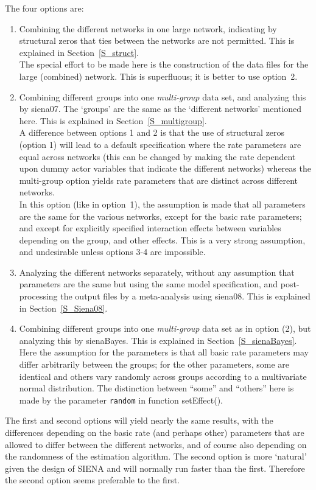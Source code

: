 \documentclass[a4paper,fleqn,11pt]{article}
\newcommand{\+}{\, + \,}
\newcommand{\sfn}[1]{\textsf{#1}}
\newcommand{\SI}{{\sf SIENA }}
\begin{document}
\noindent
The four options are:
\begin{enumerate}
\item Combining the different networks in one large network,
      indicating by structural zeros that ties between the
      networks are not permitted.
      This is explained in Section~\ref{S_struct}.\\
      The special effort to be made here is the construction
      of the data files for the large (combined) network.
      This is superfluous; it is better to use option~2.
\item Combining different groups
      into one \emph{multi-group} data set,
      and analyzing this by \sfn{siena07}.
      The `groups' are the same as the `different networks'
      mentioned here.
      This is explained in Section~\ref{S_multigroup}.\\
      A difference between options 1 and 2 is that the use
      of structural zeros (option 1) will lead to a default specification
      where the rate parameters are equal across networks
      (this can be changed by making the rate dependent upon dummy actor
      variables that indicate the different networks)
      whereas the multi-group option yields rate parameters
      that are distinct across different networks.\\
      In this option (like in option~1), the assumption is made that all
      parameters are the same for the various networks,
      except for the basic rate parameters;
      and except for explicitly specified interaction
      effects between variables depending on the group, and other effects.
      This is a very strong assumption, and undesirable unless
      options 3-4 are impossible.
\item Analyzing the different networks separately, without any assumption
      that parameters are the same but using the same model specification,
      and post-processing the output files by a meta-analysis
      using \textsf{siena08}.
      This is explained in Section~\ref{S_Siena08}.
\item Combining different groups into one \emph{multi-group} data set
      as in option (2), but analyzing this by \sfn{sienaBayes}.
      This is explained in Section~\ref{S_sienaBayes}.\\
      Here the assumption for the parameters is that all basic rate parameters
      may differ arbitrarily between the groups;
      for the other parameters, some are identical and others vary randomly across
      groups according to a multivariate normal distribution.
      The distinction between ``some'' and ``others'' here is made by
      the parameter \texttt{random} in function \sfn{setEffect()}.
\end{enumerate}
The first and second options will yield nearly the same results, with the
differences depending on the basic rate (and perhaps other) parameters
that are
allowed to differ between the different networks, and of course
also depending on the randomness of the estimation algorithm.
The second option is more `natural' given the design of \SI and
will normally run faster than the first.
Therefore the second option seems preferable to the first.
\end{document}

